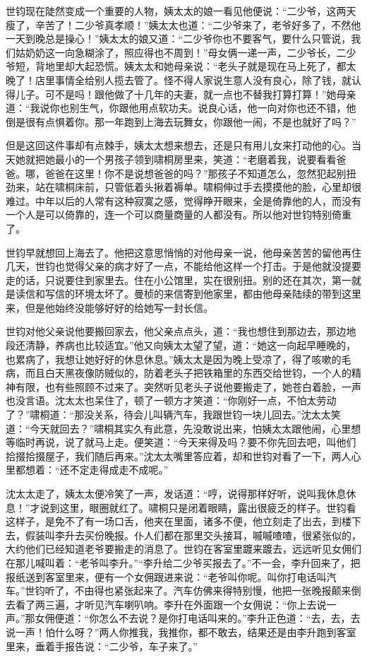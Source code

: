\par 世钧现在陡然变成一个重要的人物，姨太太的娘一看见他便说：“二少爷，这两天瘦了，辛苦了！二少爷真孝顺！”姨太太也道：“二少爷来了，老爷好多了，不然他一天到晚总是操心！”姨太太的娘又道：“二少爷你也不要客气，要什么只管说，我们姑奶奶这一向急糊涂了，照应得也不周到！”母女俩一递一声，二少爷长，二少爷短，背地里却大起恐慌。姨太太和她母亲说：“老头子就是现在马上死了，都太晚了！店里事情全给别人揽去管了。怪不得人家说生意人没有良心，除了钱，就认得儿子。可不是吗！跟他做了十几年的夫妻，就一点也不替我打算打算！”她母亲道：“我说你也别生气，你跟他用点软功夫。说良心话，他一向对你也还不错，他倒是很有点惧着你。那一年跑到上海去玩舞女，你跟他一闹，不是也就好了吗？”
\par 但是这回这件事却有点棘手，姨太太想来想去，还是只有用儿女来打动他的心。当天她就把她最小的一个男孩子领到啸桐房里来，笑道：“老磨着我，说要看看爸爸。哪，爸爸在这里！你不是说想爸爸的吗？”那孩子不知道怎么，忽然犯起别扭劲来，站在啸桐床前，只管低着头揪着褥单。啸桐伸过手去摸摸他的脸，心里却很难过。中年以后的人常有这种寂寞之感，觉得睁开眼来，全是倚靠他的人，而没有一个人是可以倚靠的，连一个可以商量商量的人都没有。所以他对世钧特别倚重了。
\par 世钧早就想回上海去了。他把这意思悄悄的对他母亲一说，他母亲苦苦的留他再住几天，世钧也觉得父亲的病才好了一点，不能给他这样一个打击。于是他就没提要走的话，只说要住到家里去。住在小公馆里，实在很别扭。别的还在其次，第一就是读信和写信的环境太坏了。曼桢的来信寄到他家里，都由他母亲陆续的带到这里来，但是他始终没能够好好的给她写一封长信。
\par 世钧对他父亲说他要搬回家去，他父亲点点头，道：“我也想住到那边去，那边地段还清静，养病也比较适宜。”他又向姨太太望了望，道：“她这一向起早睡晚的，也累病了，我想让她好好的休息休息。”姨太太是因为晚上受凉了，得了咳嗽的毛病，而且白天黑夜像防贼似的，防着老头子把铁箱里的东西交给世钧，一个人的精神有限，也有些照顾不过来了。突然听见老头子说他要搬走了，她苍白着脸，一声也没言语。沈太太也呆住了，顿了一顿方才笑道：“你刚好一点，不怕太劳动了？”啸桐道：“那没关系，待会儿叫辆汽车，我跟世钧一块儿回去。”沈太太笑道：“今天就回去？”啸桐其实久有此意，先没敢说出来，怕姨太太跟他闹，心里想等临时再说，说了就马上走。便笑道：“今天来得及吗？要不你先回去吧，叫他们拾掇拾掇屋子，我们随后再来。”沈太太嘴里答应着，却和世钧对看了一下，两人心里都想着：“还不定走得成走不成呢。”
\par 沈太太走了，姨太太便冷笑了一声，发话道：“哼，说得那样好听，说叫我休息休息！”才说到这里，眼圈就红了。啸桐只是闭着眼睛，露出很疲乏的样子。世钧看这样子，是免不了有一场口舌，他夹在里面，诸多不便，他立刻走了出去，到楼下去，假装叫李升去买份晚报。仆人们都在那里交头接耳，嘁嘁喳喳，很紧张似的，大约他们已经知道老爷要搬走的消息了。世钧在客室里踱来踱去，远远听见女佣们在那儿喊叫着：“老爷叫李升。”“李升给二少爷买报去了。”不一会，李升回来了，把报纸送到客室里来，便有一个女佣跟进来说：“老爷叫你呢。叫你打电话叫汽车。”世钧听了，不由得也紧张起来了。汽车仿佛来得特别慢，他把一张晚报颠来倒去看了两三遍，才听见汽车喇叭响。李升在外面跟一个女佣说：“你上去说一声。”那女佣便道：“你怎么不去说？是你打电话叫来的。”李升正色道：“去，去，去说一声！怕什么呀？”两人你推我，我推你，都不敢去，结果还是由李升跑到客室里来，垂着手报告说：“二少爷，车子来了。”
